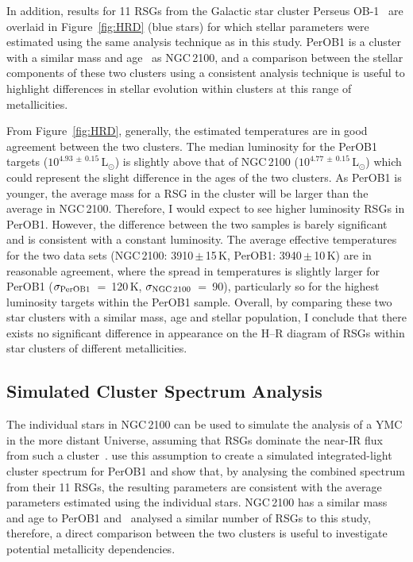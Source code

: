 In addition, results for 11 RSGs from the Galactic star cluster Perseus OB-1~\citep[PerOB1;][]{2014ApJ...787..142G} are overlaid in Figure~\ref{fig:HRD} (blue stars) for which stellar parameters were estimated using the same analysis technique as in this study.
PerOB1 is a cluster with a similar mass and age~\citep[$2\times10^{4}\,$M$_{\odot}$ and 14\,Myr respectively;][]{2010ApJS..186..191C}
as NGC\,2100, and a comparison between the stellar components of these two clusters using a consistent analysis technique is useful to highlight differences in stellar evolution within clusters at this range of metallicities.

From Figure~\ref{fig:HRD}, generally, the estimated temperatures are in good agreement between the two clusters.
The median luminosity for the PerOB1 targets ($10^{4.93\,\pm\,0.15}\,$L$_{\odot}$) is slightly above that of NGC\,2100 ($10^{4.77\,\pm\,0.15}\,$L$_{\odot}$) which could represent the slight difference in the ages of the two clusters.
As PerOB1 is younger, the average mass for a RSG in the cluster will be larger than the average in NGC\,2100.
Therefore, I would expect to see higher luminosity RSGs in PerOB1.
However, the difference between the two samples is barely significant and is consistent with a constant luminosity.
The average effective temperatures for the two data sets (NGC\,2100: 3910\,$\pm$\,15\,K, PerOB1: 3940\,$\pm$\,10\,K) are in reasonable agreement, where the spread in temperatures is slightly larger for PerOB1
($\sigma_{\rm PerOB1}$~=~120\,K, $\sigma_{\rm NGC\,2100}$~=~90),
particularly so for the highest luminosity targets within the PerOB1 sample.
Overall, by comparing these two star clusters with a similar mass, age and stellar population, I conclude that there exists no significant difference in appearance on the H--R diagram of RSGs within star clusters of different metallicities.


\subsection{Simulated Cluster Spectrum Analysis} %
\label{sub:integrated_light_cluster_analysis}

The individual stars in NGC\,2100 can be used to simulate the analysis of a YMC in the more distant Universe, assuming that RSGs dominate the near-IR flux from such a cluster~\citep{2013MNRAS.430L..35G}.
\cite{2014ApJ...788...58G} use this assumption to create a simulated integrated-light cluster spectrum for PerOB1 and show that, by analysing the combined spectrum from their 11 RSGs, the resulting parameters are consistent with the average parameters estimated using the individual stars.
NGC\,2100 has a similar mass and age to PerOB1 and~\cite{2014ApJ...788...58G} analysed a similar number of RSGs to this study,
therefore, a direct comparison between the two clusters is useful to investigate potential metallicity dependencies.

